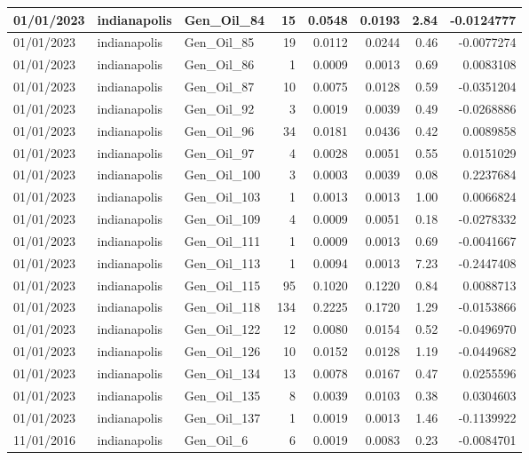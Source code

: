 \documentclass[
  letterpaper,
  DIV=11,
  numbers=noendperiod]{scrartcl}
\begin{document}
\begin{tabular}{l|l|l|r|r|r|r|r}
\hline
01/01/2023 & indianapolis & Gen\_Oil\_84 & 15 & 0.0548 & 0.0193 & 2.84 & -0.0124777\\
\hline
01/01/2023 & indianapolis & Gen\_Oil\_85 & 19 & 0.0112 & 0.0244 & 0.46 & -0.0077274\\
\hline
01/01/2023 & indianapolis & Gen\_Oil\_86 & 1 & 0.0009 & 0.0013 & 0.69 & 0.0083108\\
\hline
01/01/2023 & indianapolis & Gen\_Oil\_87 & 10 & 0.0075 & 0.0128 & 0.59 & -0.0351204\\
\hline
01/01/2023 & indianapolis & Gen\_Oil\_92 & 3 & 0.0019 & 0.0039 & 0.49 & -0.0268886\\
\hline
01/01/2023 & indianapolis & Gen\_Oil\_96 & 34 & 0.0181 & 0.0436 & 0.42 & 0.0089858\\
\hline
01/01/2023 & indianapolis & Gen\_Oil\_97 & 4 & 0.0028 & 0.0051 & 0.55 & 0.0151029\\
\hline
01/01/2023 & indianapolis & Gen\_Oil\_100 & 3 & 0.0003 & 0.0039 & 0.08 & 0.2237684\\
\hline
01/01/2023 & indianapolis & Gen\_Oil\_103 & 1 & 0.0013 & 0.0013 & 1.00 & 0.0066824\\
\hline
01/01/2023 & indianapolis & Gen\_Oil\_109 & 4 & 0.0009 & 0.0051 & 0.18 & -0.0278332\\
\hline
01/01/2023 & indianapolis & Gen\_Oil\_111 & 1 & 0.0009 & 0.0013 & 0.69 & -0.0041667\\
\hline
01/01/2023 & indianapolis & Gen\_Oil\_113 & 1 & 0.0094 & 0.0013 & 7.23 & -0.2447408\\
\hline
01/01/2023 & indianapolis & Gen\_Oil\_115 & 95 & 0.1020 & 0.1220 & 0.84 & 0.0088713\\
\hline
01/01/2023 & indianapolis & Gen\_Oil\_118 & 134 & 0.2225 & 0.1720 & 1.29 & -0.0153866\\
\hline
01/01/2023 & indianapolis & Gen\_Oil\_122 & 12 & 0.0080 & 0.0154 & 0.52 & -0.0496970\\
\hline
01/01/2023 & indianapolis & Gen\_Oil\_126 & 10 & 0.0152 & 0.0128 & 1.19 & -0.0449682\\
\hline
01/01/2023 & indianapolis & Gen\_Oil\_134 & 13 & 0.0078 & 0.0167 & 0.47 & 0.0255596\\
\hline
01/01/2023 & indianapolis & Gen\_Oil\_135 & 8 & 0.0039 & 0.0103 & 0.38 & 0.0304603\\
\hline
01/01/2023 & indianapolis & Gen\_Oil\_137 & 1 & 0.0019 & 0.0013 & 1.46 & -0.1139922\\
\hline
11/01/2016 & indianapolis & Gen\_Oil\_6 & 6 & 0.0019 & 0.0083 & 0.23 & -0.0084701\\

\end{tabular}
\end{document}
